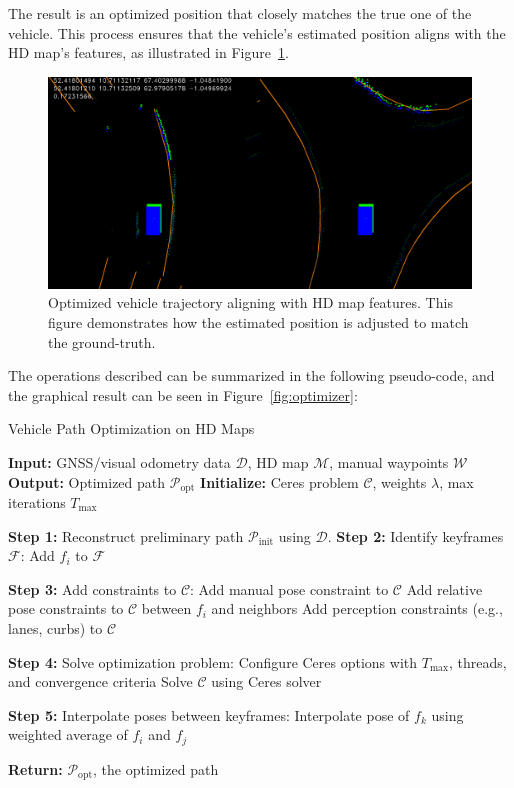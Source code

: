 The result is an optimized position that closely matches the true one of the vehicle. This process ensures that the vehicle’s estimated position aligns with the HD map's features, as illustrated in Figure~\ref{fig:optimized-path}.
\begin{figure}[H]
    \centering
    \includegraphics[width=0.75\linewidth]{LateX//figs/opt_pose.png}
    \caption{Optimized vehicle trajectory aligning with HD map features. This figure demonstrates how the estimated position is adjusted to match the ground-truth.}
    \label{fig:optimized-path}
\end{figure}


The operations described can be summarized in the following pseudo-code, and the graphical result can be seen in Figure~\ref{fig:optimizer}:
\begin{algorithm}[H]
\caption{Vehicle Path Optimization on HD Maps}
\begin{algorithmic}[1]
\State \textbf{Input:} GNSS/visual odometry data $\mathcal{D}$, HD map $\mathcal{M}$, manual waypoints $\mathcal{W}$
\State \textbf{Output:} Optimized path $\mathcal{P}_{\text{opt}}$
\State \textbf{Initialize:} Ceres problem $\mathcal{C}$, weights $\lambda$, max iterations $T_{\text{max}}$

\State \textbf{Step 1:} Reconstruct preliminary path $\mathcal{P}_{\text{init}}$ using $\mathcal{D}$.
\State \textbf{Step 2:} Identify keyframes $\mathcal{F}$:
        \State Add $f_i$ to $\mathcal{F}$
    \EndIf
\EndFor

\State \textbf{Step 3:} Add constraints to $\mathcal{C}$:
        \State Add manual pose constraint to $\mathcal{C}$
    \EndIf
    \State Add relative pose constraints to $\mathcal{C}$ between $f_i$ and neighbors
    \State Add perception constraints (e.g., lanes, curbs) to $\mathcal{C}$
\EndFor

\State \textbf{Step 4:} Solve optimization problem:
\State Configure Ceres options with $T_{\text{max}}$, threads, and convergence criteria
\State Solve $\mathcal{C}$ using Ceres solver

\State \textbf{Step 5:} Interpolate poses between keyframes:
        \State Interpolate pose of $f_k$ using weighted average of $f_i$ and $f_j$
    \EndFor
\EndFor

\State \textbf{Return:} $\mathcal{P}_{\text{opt}}$, the optimized path
\end{algorithmic}
\end{algorithm}

